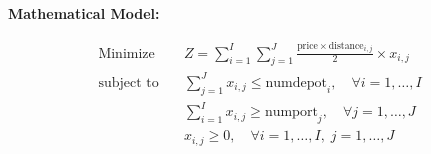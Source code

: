 \documentclass{article}
\begin{document}
\textbf{Mathematical Model:}

\begin{align*}
\text{Minimize} \quad & Z = \sum_{i=1}^{I} \sum_{j=1}^{J} \frac{\text{price} \times \text{distance}_{i,j}}{2} \times x_{i,j} \\
\text{subject to} \quad & \sum_{j=1}^{J} x_{i,j} \leq \text{numdepot}_i, \quad \forall i=1,\ldots,I \\
& \sum_{i=1}^{I} x_{i,j} \geq \text{numport}_j, \quad \forall j=1,\ldots,J \\
& x_{i,j} \geq 0, \quad \forall i=1,\ldots,I,\; j=1,\ldots,J
\end{align*}
\end{document}
